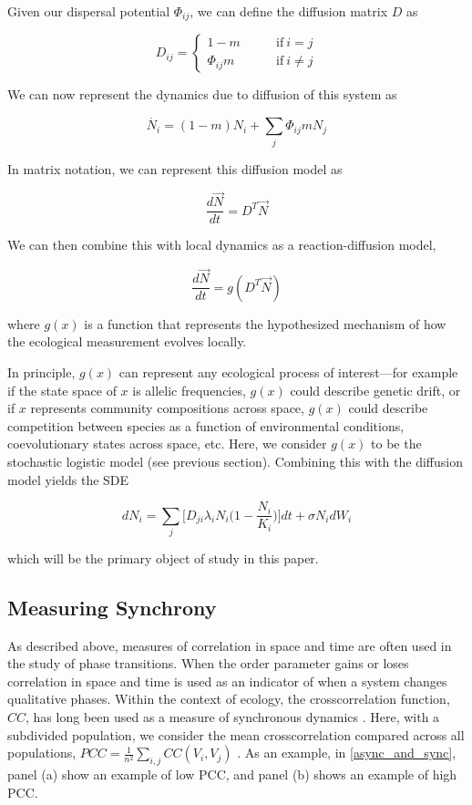 \documentclass[]{article}
\begin{document}
Given our dispersal potential $\Phi_{ij}$, we can define the
diffusion matrix \( D \) as

\[D_{ij} = \begin{cases} 1 - m \quad\quad &\text{if}\ i = j \\ \Phi_{ij}m & \text{if}\ i \neq j\end{cases}\]

We can now represent the
dynamics due to diffusion of this system as

\[\dot{N_i}=(1-m)N_i+ \sum_j \Phi_{ij}mN_j\]

In matrix notation, we can represent this diffusion model as

\[\frac{d\vec{N}}{dt}=D^T\vec{N}\]

We can then combine this with local dynamics as a reaction-diffusion
model,

\[\frac{d\vec{N}}{dt} = g(D^T \vec{N})\]

where \(g(x)\) is a function that represents the hypothesized mechanism
of how the ecological measurement evolves locally.


In principle, \(g(x)\) can represent any ecological process of
interest---for example if the state space of \(x\) is allelic
frequencies, \(g(x)\) could describe genetic drift, or if \(x\)
represents community compositions across space, \(g(x)\) could describe
competition between species as a function of environmental conditions,
coevolutionary states across space, etc. Here, we consider \(g(x)\) to
be the stochastic logistic model (see previous section). Combining this
with the diffusion model yields the SDE

\begin{equation} \label{diffusion_model}
    dN_i = \sum_j \bigg[ D_{ji} \lambda_i N_i \bigg(1-\frac{N_i}{K_i}\bigg)  \bigg] dt + \sigma N_i dW_i
\end{equation}

which will be the primary object of study in this paper.

\hypertarget{measuring-synchrony}{%
\subsection{Measuring Synchrony}\label{measuring-synchrony}}

As described above, measures of correlation in space and time are often
used in the study of phase transitions. When the order parameter gains
or loses correlation in space and time is used as an indicator of when a
system changes qualitative phases. Within the context of ecology, the
crosscorrelation function, \(CC\), has long been used as a measure of
synchronous dynamics \cite{liebhold_spatial_2004}. Here, with a subdivided
population, we consider the mean crosscorrelation compared across all
populations, \({PCC}=\frac{1}{n^2}\sum_{i,j} CC(V_i,V_j)\) . As an
example, in \ref{async_and_sync}, panel (a) show an example of low PCC,
and panel (b) shows an example of high PCC.
\end{document}
